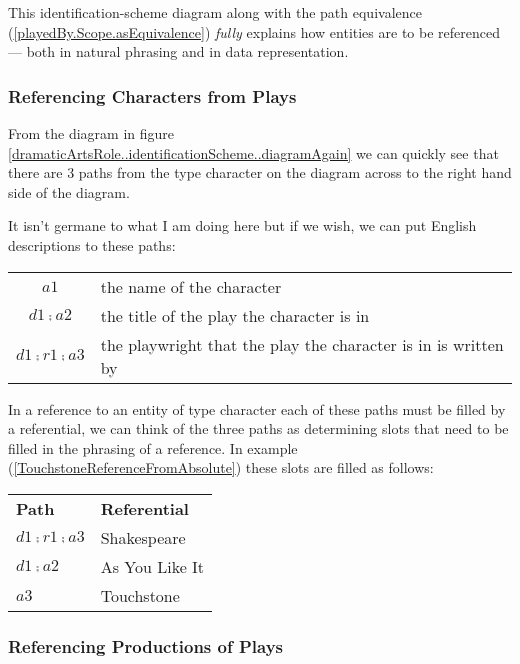 This identification-scheme diagram along with the path equivalence (\ref{playedBy.Scope.asEquivalence})
 \textit{fully} explains how entities are to be referenced — both in natural phrasing and in data representation.

\subsubsection{Referencing Characters from Plays}

From the diagram in figure \ref{dramaticArtsRole..identificationScheme..diagramAgain} 
we can quickly see that there are 3 paths from the type character on the diagram across to the right hand side of the diagram.
 
It isn't germane to what I am doing here but if we wish, we can put English descriptions to these paths:
\begin{center}
\begin{tabular}{c p{8cm}}
$a1$ & the name of the character \\
$d1 \comp a2$ & the title of the play the character is in \\
$d1 \comp r1 \comp a3$ & the playwright that the play the character is in is written by 
\end{tabular}
\end{center} 

In a reference to an entity of type character each of these paths must be filled by a referential, 
we can think of the three paths as determining slots that need to be filled  in the phrasing of a reference. 
In example (\ref{TouchstoneReferenceFromAbsolute}) these slots are filled as follows:


\begin{center}
\begin{tabular}{l l}
\textbf{Path}          & \textbf{Referential} \\
$d1 \comp r1 \comp a3$ & Shakespeare          \\
$d1 \comp a2$          & As You Like It       \\
$a3         $          & Touchstone
\end{tabular}
\end{center}

\subsubsection{Referencing Productions of Plays}

